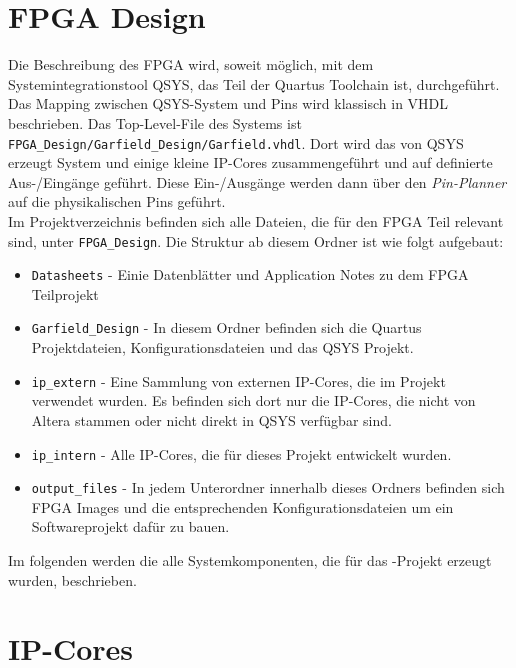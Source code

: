 \section{\ac{FPGA} Design}
Die Beschreibung des \ac{FPGA} wird, soweit möglich, mit dem Systemintegrationstool QSYS, das Teil der Quartus Toolchain ist, durchgeführt. Das Mapping zwischen QSYS-System und Pins wird klassisch in VHDL beschrieben. Das Top-Level-File des Systems ist \\ \texttt{FPGA\_Design/Garfield\_Design/Garfield.vhdl}. Dort wird das von QSYS erzeugt System und einige kleine \ac{IP}-Cores zusammengeführt und auf definierte Aus-/Eingänge geführt. Diese Ein-/Ausgänge werden dann über den \textit{Pin-Planner} auf die physikalischen Pins geführt.\\
Im Projektverzeichnis befinden sich alle Dateien, die für den \ac{FPGA} Teil relevant sind, unter \texttt{FPGA\_Design}. Die Struktur ab diesem Ordner ist wie folgt aufgebaut:
\begin{itemize}
	\item \texttt{Datasheets} - Einie Datenblätter und Application Notes zu dem \ac{FPGA} Teilprojekt
	\item \texttt{Garfield\_Design} - In diesem Ordner befinden sich die Quartus Projektdateien, Konfigurationsdateien und das QSYS Projekt.
	\item \texttt{ip\_extern} - Eine Sammlung von externen \ac{IP}-Cores, die im Projekt verwendet wurden. Es befinden sich dort nur die \ac{IP}-Cores, die nicht von Altera stammen oder nicht direkt in QSYS verfügbar sind.
	\item \texttt{ip\_intern} - Alle \ac{IP}-Cores, die für dieses Projekt entwickelt wurden.
	\item \texttt{output\_files} - In jedem Unterordner innerhalb dieses Ordners befinden sich \ac{FPGA} Images und die entsprechenden Konfigurationsdateien um ein Softwareprojekt dafür zu bauen.
\end{itemize}

Im folgenden werden die alle Systemkomponenten, die für das \Projectname-Projekt erzeugt wurden, beschrieben.

\section{\ac{IP}-Cores}
\label{IP-Cores}

